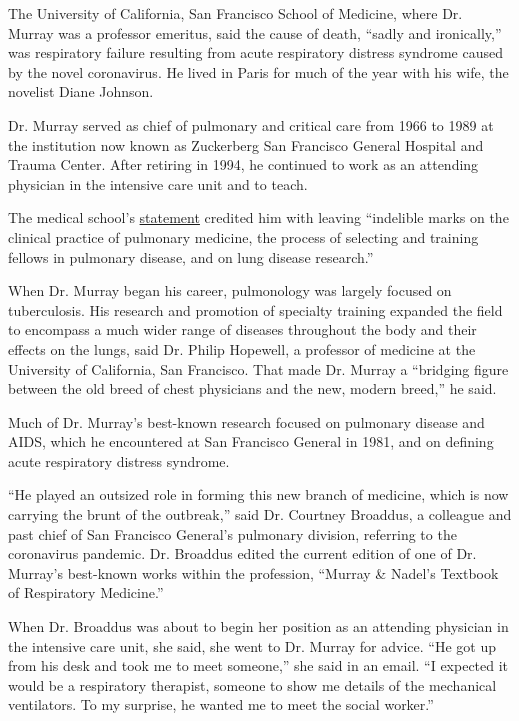 The University of California, San Francisco School of Medicine, where
Dr. Murray was a professor emeritus, said the cause of death, ``sadly
and ironically,'' was respiratory failure resulting from acute
respiratory distress syndrome caused by the novel coronavirus. He lived
in Paris for much of the year with his wife, the novelist Diane Johnson.

Dr. Murray served as chief of pulmonary and critical care from 1966 to
1989 at the institution now known as Zuckerberg San Francisco General
Hospital and Trauma Center. After retiring in 1994, he continued to work
as an attending physician in the intensive care unit and to teach.

The medical school's
\href{https://medschool.ucsf.edu/remembering-john-f-murray-md}{statement}
credited him with leaving ``indelible marks on the clinical practice of
pulmonary medicine, the process of selecting and training fellows in
pulmonary disease, and on lung disease research.''

When Dr. Murray began his career, pulmonology was largely focused on
tuberculosis. His research and promotion of specialty training expanded
the field to encompass a much wider range of diseases throughout the
body and their effects on the lungs, said Dr. Philip Hopewell, a
professor of medicine at the University of California, San Francisco.
That made Dr. Murray a ``bridging figure between the old breed of chest
physicians and the new, modern breed,'' he said.

Much of Dr. Murray's best-known research focused on pulmonary disease
and AIDS, which he encountered at San Francisco General in 1981, and on
defining acute respiratory distress syndrome.

``He played an outsized role in forming this new branch of medicine,
which is now carrying the brunt of the outbreak,'' said Dr. Courtney
Broaddus, a colleague and past chief of San Francisco General's
pulmonary division, referring to the coronavirus pandemic. Dr. Broaddus
edited the current edition of one of Dr. Murray's best-known works
within the profession, ``Murray \& Nadel's Textbook of Respiratory
Medicine.''

When Dr. Broaddus was about to begin her position as an attending
physician in the intensive care unit, she said, she went to Dr. Murray
for advice. ``He got up from his desk and took me to meet someone,'' she
said in an email. ``I expected it would be a respiratory therapist,
someone to show me details of the mechanical ventilators. To my
surprise, he wanted me to meet the social worker.''

